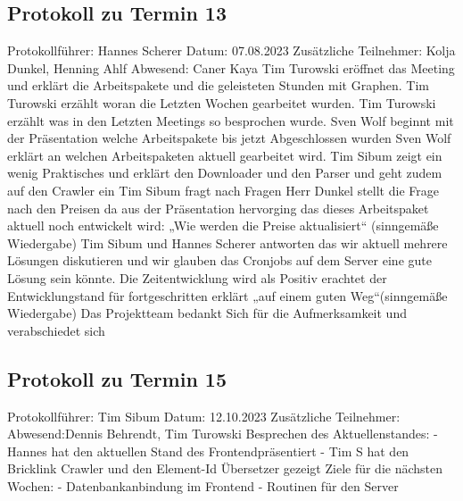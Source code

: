 \subsection{Protokoll zu Termin 13}
Protokollführer: Hannes Scherer \newline
Datum: 07.08.2023 \newline
Zusätzliche Teilnehmer: Kolja Dunkel, Henning Ahlf  \newline
Abwesend: Caner Kaya \newline \newline
Tim Turowski eröffnet das Meeting und erklärt die Arbeitspakete und die geleisteten Stunden mit Graphen. 
Tim Turowski erzählt woran die Letzten Wochen gearbeitet wurden.
Tim Turowski erzählt was in den Letzten Meetings so besprochen wurde.
Sven Wolf beginnt mit der Präsentation welche Arbeitspakete bis jetzt Abgeschlossen wurden
Sven Wolf erklärt an welchen Arbeitspaketen aktuell gearbeitet wird. 
Tim Sibum zeigt ein wenig Praktisches und erklärt den Downloader und den Parser und geht zudem auf den Crawler ein
Tim Sibum fragt nach Fragen
Herr Dunkel stellt die Frage nach den Preisen da aus der Präsentation hervorging das dieses Arbeitspaket aktuell noch entwickelt wird: „Wie werden die Preise aktualisiert“ (sinngemäße Wiedergabe) 
Tim Sibum und Hannes Scherer antworten das wir aktuell mehrere Lösungen diskutieren und wir glauben das Cronjobs auf dem Server eine gute Lösung sein könnte.
Die Zeitentwicklung wird als Positiv erachtet der Entwicklungstand für fortgeschritten erklärt „auf einem guten Weg“(sinngemäße Wiedergabe)
Das Projektteam bedankt Sich für die Aufmerksamkeit und verabschiedet sich
\subsection{Protokoll zu Termin 15}
Protokollführer: Tim Sibum \newline
Datum: 12.10.2023 \newline
Zusätzliche Teilnehmer:\newline
Abwesend:Dennis Behrendt, Tim Turowski \newline \newline
Besprechen des Aktuellenstandes:\newline
- Hannes hat den aktuellen Stand des Frontendpräsentiert\newline
- Tim S hat den Bricklink Crawler und den Element-Id Übersetzer gezeigt\newline
Ziele für die nächsten Wochen:\newline
- Datenbankanbindung im Frontend\newline
- Routinen für den Server\newline


